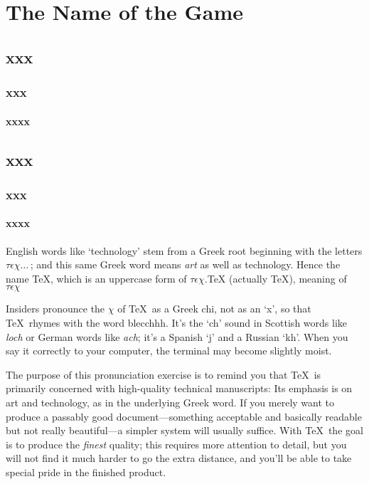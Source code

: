 
\chapter{The Name of the Game}
\section{xxx}
\subsection{xxx}
\subsubsection{xxxx}
\section{xxx}
\subsection{xxx}
\subsubsection{xxxx}
English words like `technology' stem from a Greek root beginning with
the letters $\tau\epsilon\chi\ldots\,$; and this same Greek word means {\sl
art\/} as well as technology. Hence the name \TeX, which is an
uppercase form of $\tau\epsilon\chi$.{TeX (actually \TeX), meaning of}
$\tau\epsilon\chi$

Insiders pronounce the $\chi$ of \TeX\ as a Greek chi, not as an `x', so that
\TeX\ rhymes with the word blecchhh. It's the `ch' sound in Scottish words
like {\sl loch\/} or German words like {\sl ach\/}; it's a Spanish `j' and a
Russian `kh'. When you say it correctly to your computer, the terminal
may become slightly moist.

The purpose of this pronunciation exercise is to remind you that \TeX\ is
primarily concerned with high-quality technical manuscripts: Its emphasis is
on art and technology, as in the underlying Greek word. If you merely want
to produce a passably good document---something acceptable and basically
readable but not really beautiful---a simpler system will usually suffice.
With \TeX\ the goal is to produce the {\sl finest\/} quality; this requires
more attention to detail, but you will not find it much harder to go the
extra distance, and you'll be able to take special pride in the finished
product.

